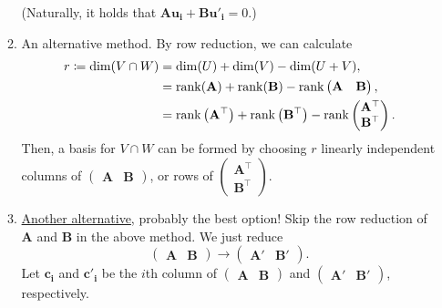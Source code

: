 \documentclass[../Notes.tex]{subfiles}
\begin{document}
\begin{stbox}{}
\begin{itemize}
\begin{enumerate}
            (Naturally, it holds that \(\mathbf{A}\mathbf{u_i}+\mathbf{B}\mathbf{u'_i}=0\).)
            \item An alternative method. By row reduction, we can calculate
            \begin{align*}
                r\coloneq\dim(V\cap W)&=\dim(U)+\dim(V)-\dim(U+V),\\
                &=\operatorname{rank}(\mathbf{A})+\operatorname{rank}(\mathbf{B})-\operatorname{rank}
                \begin{pmatrix}
                    \mathbf{A}&\mathbf{B}
                \end{pmatrix},\\
                &=\operatorname{rank}\left(\mathbf{A}^\top\right)+\operatorname{rank}\left(\mathbf{B}^\top\right)-\operatorname{rank}
                \begin{pmatrix}
                    \mathbf{A}^\top\\
                    \mathbf{B}^\top
                \end{pmatrix}.
            \end{align*}
            Then, a basis for \(V\cap W\) can be formed by choosing \(r\) linearly independent columns of 
            \(\begin{pmatrix}
                \mathbf{A}&\mathbf{B}
            \end{pmatrix}\),
                or rows of \(\begin{pmatrix}
                \mathbf{A}^\top\\
                \mathbf{B}^\top
            \end{pmatrix}\).
            \item \href{https://math.stackexchange.com/a/802878}{Another alternative}, probably the best option! Skip the row reduction of \(\mathbf{A}\) and \(\mathbf{B}\) in the above method. We just reduce
        \[\begin{pmatrix}
            \mathbf{A}&\mathbf{B}
        \end{pmatrix}\to
        \begin{pmatrix}
            \mathbf{A'}&\mathbf{B'}
        \end{pmatrix}.\]
        Let \(\mathbf{c_i}\) and \(\mathbf{c'_i}\) be the \(i\)th column of 
        \(\begin{pmatrix}
            \mathbf{A}&\mathbf{B}
        \end{pmatrix}\) and
        \(\begin{pmatrix}
            \mathbf{A'}&\mathbf{B'}
        \end{pmatrix}\), respectively.

\end{enumerate}
\end{itemize}
\end{stbox}
\end{document}
